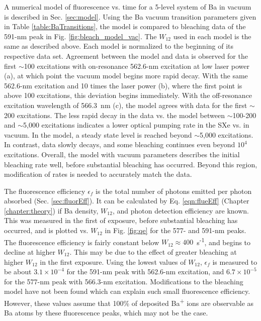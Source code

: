 A numerical model of fluorescence vs. time for a 5-level system of Ba in vacuum is described in Sec. \ref{sec:model}.  Using the Ba vacuum transition parameters given in Table \ref{table:BaTransitions}, the model is compared to bleaching data of the 591-nm peak in Fig. \ref{fig:bleach_model_vac}.  The $W_{12}$ used in each model is the same as described above.  Each model is normalized to the beginning of its respective data set.  Agreement between the model and data is observed for the first $\sim$100 excitations with on-resonance 562.6-nm excitation at low laser power (a), at which point the vacuum model begins more rapid decay.  With the same 562.6-nm excitation and 10 times the laser power (b), where the first point is above 100 excitations, this deviation begins immediately.  With the off-resonance excitation wavelength of 566.3~nm (c), the model agrees with data for the first $\sim$200 excitations.  The less rapid decay in the data vs. the model between $\sim$100-200 and $\sim$5,000 excitations indicates a lower optical pumping rate in the SXe vs. in vacuum.  In the model, a steady state level is reached beyond $\sim$5,000 excitations.  In contrast, data slowly decays, and some bleaching continues even beyond $10^{4}$ excitations.  Overall, the model with vacuum parameters describes the initial bleaching rate well, before substantial bleaching has occurred.  Beyond this region, modification of rates is needed to accurately match the data.

The fluorescence efficiency $\epsilon_{f}$ is the total number of photons emitted per photon absorbed (Sec. \ref{sec:fluorEff}).  It can be calculated by Eq. \ref{eqn:flueEff} (Chapter \ref{chapter:theory}) if Ba density, $W_{12}$, and photon detection efficiency are known.  This was measured in the first of exposure, before substantial bleaching has occurred, and is plotted vs. $W_{12}$ in Fig. \ref{fig:qe} for the 577- and 591-nm peaks.  The fluorescence efficiency is fairly constant below $W_{12} \approx 400$~s\textsuperscript{-1}, and begins to decline at higher $W_{12}$.  This may be due to the effect of greater bleaching at higher $W_{12}$ in the first exposure.  Using the lowest values of $W_{12}$, $\epsilon_{f}$ is measured to be about $3.1 \times 10^{-4}$ for the 591-nm peak with 562.6-nm excitation, and $6.7 \times 10^{-5}$ for the 577-nm peak with 566.3-nm excitation.  Modifications to the bleaching model have not been found which can explain such small fluorescence efficiency.  However, these values assume that 100\% of deposited Ba\textsuperscript{+} ions are observable as Ba atoms by these fluorescence peaks, which may not be the case.

